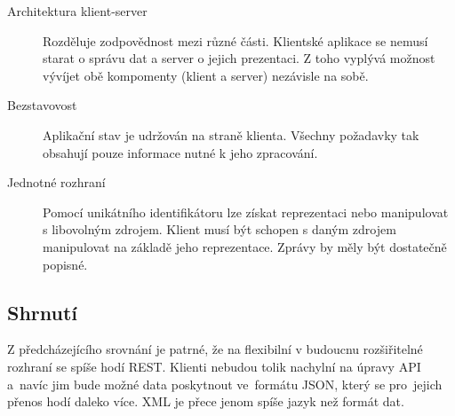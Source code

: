 \begin{description}
    \item[Architektura klient-server]
    Rozděluje zodpovědnost mezi různé části. Klientské aplikace se nemusí starat o správu dat a server o jejich prezentaci.
    Z toho vyplývá možnost vývíjet obě kompomenty (klient a server) nezávisle na sobě.
    \item[Bezstavovost]
    Aplikační stav je udržován na straně klienta. Všechny požadavky tak obsahují pouze informace nutné k jeho zpracování.  
    \item[Jednotné rozhraní]
    Pomocí unikátního identifikátoru lze získat reprezentaci nebo manipulovat s libovolným zdrojem.
    Klient musí být schopen s daným zdrojem manipulovat na základě jeho reprezentace. Zprávy by měly být dostatečně popisné.
\end{description}

\subsection{Shrnutí}

Z předcházejícího srovnání je patrné, že na flexibilní v budoucnu rozšiřitelné rozhraní se spíše hodí REST.
Klienti nebudou tolik nachylní na úpravy API a~navíc jim bude možné data poskytnout ve~formátu JSON,
který se pro~jejich přenos hodí daleko více. XML je přece jenom spíše jazyk než formát dat.